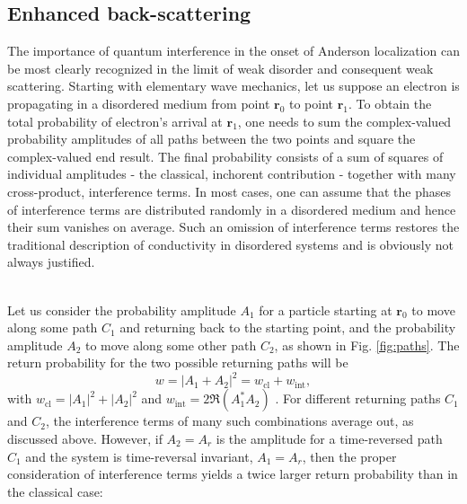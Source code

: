 \documentclass[10pt,a4paper]{article}
\begin{document}
\subsection{Enhanced back-scattering }
\label{sec:enhanced}
The importance of quantum interference in the onset of Anderson localization can be most clearly recognized in the limit of weak disorder and consequent weak scattering. Starting with elementary wave mechanics, let us suppose an electron is propagating in a disordered medium from point $\mathbf{r}_0$ to point $\mathbf{r}_1$. To obtain the total probability of electron's arrival at $\mathbf{r}_1$, one needs to sum the complex-valued probability amplitudes of all paths between the two points and square the complex-valued end result. The final probability consists of a sum of squares of individual amplitudes - the classical, inchorent contribution - together with many cross-product, interference terms. In most cases, one can assume that the phases of interference terms are distributed randomly in a disordered medium and hence their sum vanishes on average. Such an omission of interference terms restores the traditional description of conductivity in disordered systems and is obviously not always justified.\\\\
\begin{minipage}[t]{0.58\textwidth}
\noindent  
    Let us consider the probability amplitude $A_1$ for a particle starting at $\mathbf{r}_0$ to move along some path $C_1$ and returning back to the starting point, and the probability amplitude $A_2$ to move along some other path $C_2$, as shown in Fig. \ref{fig:paths}. The return probability for the two possible returning paths will be 
    \begin{equation}
w=|A_1 + A_2|^2=w_\mathrm{cl} + w_\mathrm{int},
\end{equation}
with $w_\mathrm{cl}=|A_1|^2 + |A_2|^2$ and $w_\mathrm{int}=2\Re\left(A_1^*A_2\right)$ \cite{self-consistent}. For different returning paths $C_1$ and $C_2$, the interference terms of many such combinations average out, as discussed above. However, if $A_2=A_r$ is the amplitude for a time-reversed path $C_1$ and the system is time-reversal invariant, $A_1=A_r$, then the proper consideration of interference terms yields a twice larger return probability than in the classical case:
\end{minipage}\hfill
\end{document}

